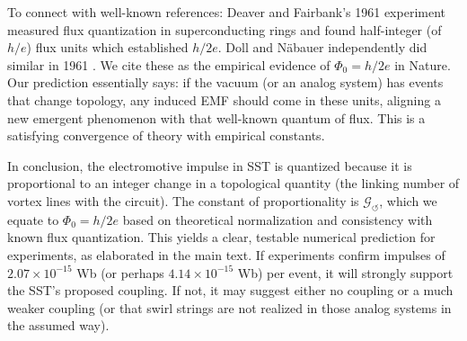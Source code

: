 \documentclass[12pt]{article}
\begin{document}
{To connect with well-known references: Deaver and Fairbank’s 1961 experiment \cite{Deaver1961} measured flux quantization in superconducting rings and found half-integer (of $h/e$) flux units which established $h/2e$. Doll and Näbauer independently did similar in 1961 \cite{Doll1961}. We cite these as the empirical evidence of $\Phi_{0}=h/2e$ in Nature. Our prediction essentially says: if the vacuum (or an analog system) has events that change topology, any induced EMF should come in these units, aligning a new emergent phenomenon with that well-known quantum of flux. This is a satisfying convergence of theory with empirical constants.

In conclusion, the electromotive impulse in SST is quantized because it is proportional to an integer change in a topological quantity (the linking number of vortex lines with the circuit). The constant of proportionality is $\mathcal{G}_{\!\boldsymbol{\circlearrowleft}}$, which we equate to $\Phi_{0}=h/2e$ based on theoretical normalization and consistency with known flux quantization. This yields a clear, testable numerical prediction for experiments, as elaborated in the main text. If experiments confirm impulses of $2.07\times10^{-15}$ Wb (or perhaps $4.14\times10^{-15}$ Wb) per event, it will strongly support the SST’s proposed coupling. If not, it may suggest either no coupling or a much weaker coupling (or that swirl strings are not realized in those analog systems in the assumed way).

}
\end{document}
